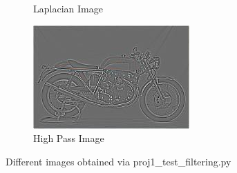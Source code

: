 \documentclass{bmvc2k}
\begin{document}
\begin{figure}[h!]
\begin{subfigure}[b]{0.3\linewidth}
    \caption{Laplacian Image}
  \end{subfigure}
  \begin{subfigure}[b]{0.3\linewidth}
    \includegraphics[width=\linewidth]{images/high_pass_image.jpg}
    \caption{High Pass Image}
  \end{subfigure}
  \caption{Different images obtained via proj1\_test\_filtering.py}
  \label{fig:coffee}
\end{figure}

\end{document}
